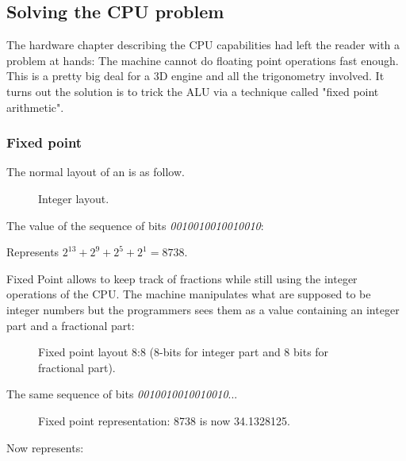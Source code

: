\subsection{Solving the CPU problem}

The hardware chapter describing the CPU capabilities had left the reader with a problem at hands: The machine cannot do floating point operations fast enough. This is a pretty big deal for a 3D engine and all the trigonometry involved. It turns out the solution is to trick the ALU via a technique called "fixed point arithmetic".







\subsubsection{Fixed point}
The normal layout of an  is as follow.
\begin{figure}[H]
\centering
 
 \caption{Integer layout.} \label{fig:int_layout}
 \end{figure}
The value of the sequence of bits \emph{0010010010010010}:
\begin{figure}[H]
\centering

 \end{figure}

Represents $ 2^{13} + 2^9 + 2^5 + 2^1 =  8738 $.\\
 \par

Fixed Point allows to keep track of fractions while still using the integer operations of the CPU. The machine manipulates what are supposed to be integer numbers but the programmers sees them as a value containing an integer part and a fractional part:\\
\par
\begin{figure}[H]
 \centering
  
 \caption{Fixed point layout 8:8 (8-bits for integer part and 8 bits for fractional part).} \label{fig:mips}
\end{figure}

The same sequence of bits \emph{0010010010010010}...
\begin{figure}[H]
 \centering
   
  \caption{Fixed point representation: 8738 is now 34.1328125.}
\end{figure} 

Now represents:\\


